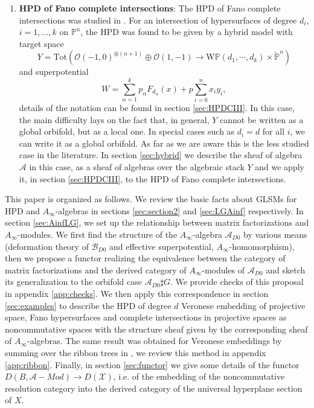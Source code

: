 \documentclass[a4paper,11pt]{article}
\def\cA{\mathcal{A}}
\newcommand{\Af}{{A_\infty}}
\numberwithin{equation}{section}
\begin{document}
\begin{enumerate}
\item \textbf{HPD of Fano complete intersections}: The 
HPD of Fano complete intersections was studied in 
\cite{Chen:2020iyo}. For an intersection of hypersurfaces of degree $d_{i}$, 
$i=1,\ldots, k$ on $\mathbb{P}^{n}$, the HPD was found to be given by a 
hybrid model with target space
\[
Y=\mathrm{Tot}\left( \mathcal{O}(-1,0)^{\oplus(n+1)} \oplus \mathcal{O}(1,-1) 
\rightarrow \mathrm{W}\mathbb{P}(d_1,\cdots,d_k) \times \check{\mathbb{P}}^n 
\right)
\]
and superpotential
\[
W = \sum _{\alpha=1}^k p_{\alpha} F_{d_{\alpha}}(x) +  p\sum_{i=0}^n x_i y_i,
\]
details of the notation can be found in section \ref{sec:HPDCIII}. In this 
case, the main difficulty lays on the fact that, in general, $Y$ cannot be 
written as a global orbifold, but as a local one. In special cases such as 
$d_{i}=d$ for all $i$, we can write it as a global orbifold. As far as we are 
aware this is the less studied case in the literature. In section 
\ref{sec:hybrid} we describe the sheaf of algebra $\mathcal{A}$ in this case, 
as a sheaf of algebras over the algebraic stack $Y$ and we apply it, in section 
\ref{sec:HPDCIII}, to the HPD of Fano complete intersections.

\end{enumerate}


This paper is organized as follows. We review the basic facts about GLSMs for 
HPD and $\Af$-algebras in sections \ref{sec:section2} and \ref{sec:LGAinf} 
respectively. In section \ref{sec:AinfLG}, we set up the relationship between 
matrix factorizations and $\Af$-modules. We first find the structure of the 
$\Af$-algebra $\cA_{D0}$ by various means (deformation theory of 
$\mathcal{B}_{D0}$ and effective superpotential, $\Af$-homomorphism), then 
we propose a functor realizing the equivalence between the category of matrix 
factorizations and the derived category of $\Af$-modules of $\cA_{D0}$ and 
sketch its generalization to the orbifold case $\cA_{D0} \sharp G$. We provide 
checks of this proposal in appendix \ref{app:checks}. We then apply this 
correspondence in section \ref{sec:examples} to describe the HPD of degree $d$ 
Veronese embedding of projective space, Fano hypersurfaces and complete 
intersections in projective spaces as noncommutative spaces with the structure 
sheaf given by the corresponding sheaf of $\Af$-algebras. The same result was 
obtained for Veronese embeddings by summing over the ribbon trees in 
\cite{ballard2014derived}, we review this method in appendix \ref{app:ribbon}. 
Finally, in section \ref{sec:functor} we give some details of the functor 
$D(B,\mathcal{A}-Mod)\rightarrow D(\mathcal{X})$, i.e. of the 
embedding of the noncommutative resolution category into the derived category 
of 
the universal hyperplane section of $X$.
\end{document}
